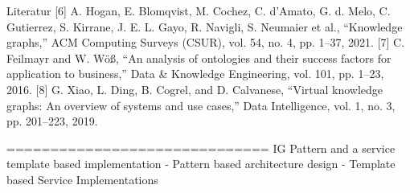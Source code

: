     Literatur
    [6] A. Hogan, E. Blomqvist, M. Cochez, C. d’Amato, G. d. Melo, C. Gutierrez, S. Kirrane, J. E. L. Gayo, R. Navigli, S. Neumaier et al., “Knowledge graphs,” ACM Computing Surveys (CSUR), vol. 54, no. 4, pp. 1–37, 2021. 
    [7] C. Feilmayr and W. Wöß, “An analysis of ontologies and their success factors for application to business,” Data & Knowledge Engineering, vol. 101, pp. 1–23, 2016. 
    [8] G. Xiao, L. Ding, B. Cogrel, and D. Calvanese, “Virtual knowledge graphs: An overview of systems and use cases,” Data Intelligence, vol. 1, no. 3, pp. 201–223, 2019.

    ==============================
    IG Pattern and a service template based implementation
        - Pattern based architecture design 
        - Template based Service Implementations
        

    
